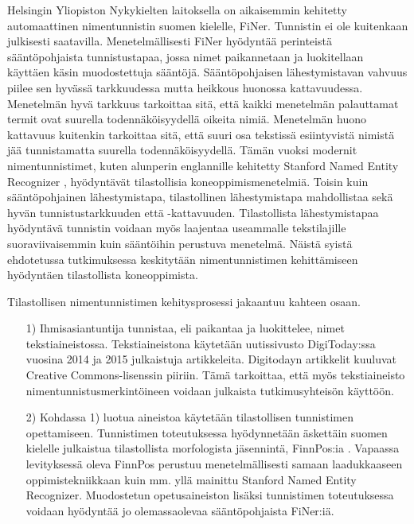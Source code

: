 \documentclass[12pt,a4paper,finnish,oneside]{article}
\begin{document}
Helsingin Yliopiston Nykykielten laitoksella on aikaisemmin kehitetty automaattinen nimentunnistin suomen kielelle, FiNer. Tunnistin ei ole kuitenkaan julkisesti saatavilla. Menetelmällisesti FiNer hyödyntää perinteistä sääntöpohjaista tunnistustapaa, jossa nimet paikannetaan ja luokitellaan käyttäen käsin muodostettuja sääntöjä. Sääntöpohjaisen lähestymistavan vahvuus piilee sen hyvässä tarkkuudessa mutta heikkous huonossa kattavuudessa. Menetelmän hyvä tarkkuus tarkoittaa sitä, että kaikki menetelmän palauttamat termit ovat suurella todennäköisyydellä oikeita nimiä. Menetelmän huono kattavuus kuitenkin tarkoittaa sitä, että suuri osa tekstissä esiintyvistä nimistä jää tunnistamatta suurella todennäköisyydellä. Tämän vuoksi modernit nimentunnistimet, kuten alunperin englannille kehitetty Stanford Named Entity Recognizer \cite{stanfordner}, hyödyntävät tilastollisia koneoppimismenetelmiä. Toisin kuin sääntöpohjainen lähestymistapa, tilastollinen lähestymistapa mahdollistaa sekä hyvän tunnistustarkkuuden että -kattavuuden. Tilastollista lähestymistapaa hyödyntävä tunnistin voidaan myös laajentaa useammalle tekstilajille suoraviivaisemmin kuin sääntöihin perustuva menetelmä. Näistä syistä ehdotetussa tutkimuksessa keskitytään nimentunnistimen kehittämiseen hyödyntäen tilastollista koneoppimista.

Tilastollisen nimentunnistimen kehitysprosessi jakaantuu kahteen osaan. 

\begin{itemize}

\item[1)] Ihmisasiantuntija tunnistaa, eli paikantaa ja luokittelee, nimet tekstiaineistossa. Tekstiaineistona käytetään uutissivusto DigiToday:ssa vuosina 2014 ja 2015 julkaistuja artikkeleita. Digitodayn artikkelit kuuluvat Creative Commons-lisenssin piiriin. Tämä tarkoittaa, että myös tekstiaineisto nimentunnistusmerkintöineen voidaan julkaista tutkimusyhteisön käyttöön.

\item[2)] Kohdassa 1) luotua aineistoa käytetään tilastollisen tunnistimen opettamiseen. Tunnistimen toteutuksessa hyödynnetään äskettäin suomen kielelle julkaistua tilastollista morfologista jäsennintä, FinnPos:ia \cite{silfverberg2015}\cite{finnpos}. Vapaassa levityksessä oleva FinnPos perustuu menetelmällisesti samaan laadukkaaseen oppimistekniikkaan kuin mm. yllä mainittu Stanford Named Entity Recognizer. Muodostetun opetusaineiston lisäksi tunnistimen toteutuksessa voidaan hyödyntää jo olemassaolevaa sääntöpohjaista FiNer:iä.

\end{itemize}
\end{document}
